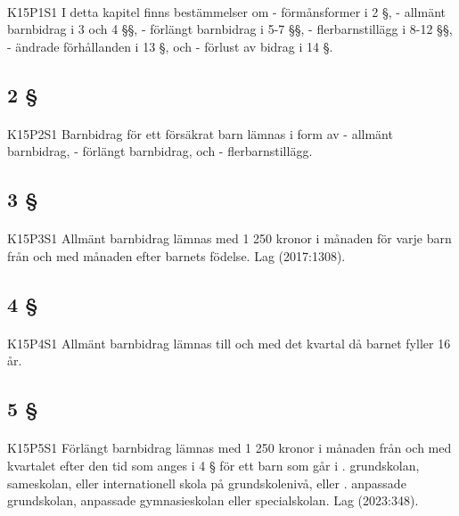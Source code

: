 \documentclass[a4paper,notitlepage,openany,10pt]{book}
\begin{document}
\paragraph*{}
{\tiny K15P1S1}
I detta kapitel finns bestämmelser om
\newline - förmånsformer i 2 §,
\newline - allmänt barnbidrag i 3 och 4 §§,
\newline - förlängt barnbidrag i 5-7 §§,
\newline - flerbarnstillägg i 8-12 §§,
\newline - ändrade förhållanden i 13 §, och
\newline - förlust av bidrag i 14 §.
\subsection*{2 §}
\paragraph*{}
{\tiny K15P2S1}
Barnbidrag för ett försäkrat barn lämnas i form av
\newline - allmänt barnbidrag,
\newline - förlängt barnbidrag, och
\newline - flerbarnstillägg.
\subsection*{3 §}
\paragraph*{}
{\tiny K15P3S1}
Allmänt barnbidrag lämnas med 1 250 kronor i månaden för varje barn från och med månaden efter barnets födelse.
Lag (2017:1308).
\subsection*{4 §}
\paragraph*{}
{\tiny K15P4S1}
Allmänt barnbidrag lämnas till och med det kvartal då barnet fyller 16 år.
\subsection*{5 §}
\paragraph*{}
{\tiny K15P5S1}
Förlängt barnbidrag lämnas med 1 250 kronor i månaden från och med kvartalet efter den tid som anges i 4 § för ett barn som går i
. grundskolan, sameskolan, eller internationell skola på grundskolenivå, eller
. anpassade grundskolan, anpassade gymnasieskolan eller specialskolan.
Lag (2023:348).
\end{document}
